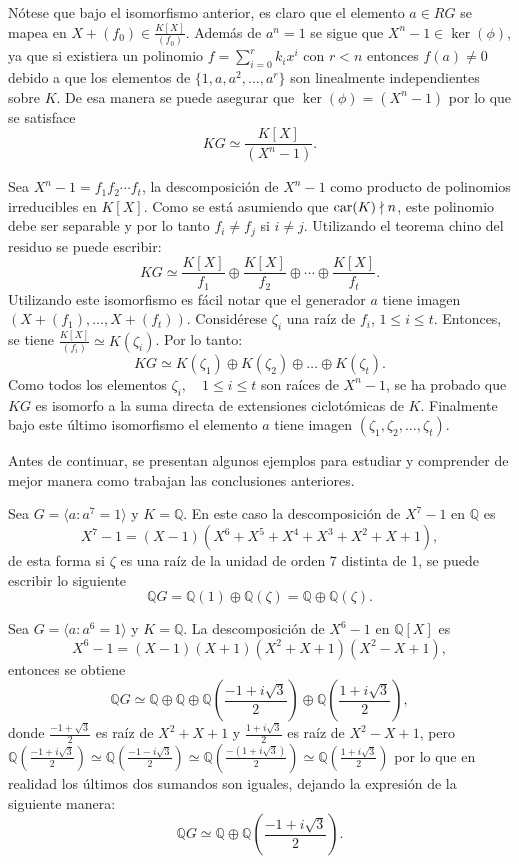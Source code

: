 Nótese que bajo el isomorfismo anterior, es claro que el elemento $a \in RG$ se mapea en $X + (f_0) \in \frac{K[X]}{(f_0)}$. Además de $a^n = 1$ se sigue que $X^n -1 \in \ker(\phi)$, ya que si existiera un polinomio $f = \sum_{i=0}^{r}k_ix^i$ con $r < n$ entonces $f(a) \neq 0$ debido a que los elementos de $\{1,a,a^2, \dots, a^r \}$ son linealmente independientes sobre $K$. De esa manera se puede asegurar que $\ker(\phi) = (X^n -1)$ por lo que se satisface 
\[KG \simeq \frac{K[X]}{(X^n -1 )}. \]

Sea $ X^n -1 = f_1f_2\cdots f_t$, la descomposición de $X^n -1$ como producto de polinomios irreducibles en $K[X]$. Como se está asumiendo que $\operatorname{car}(K) \nmid n$, este polinomio debe ser separable y por lo tanto $f_i \neq f_j$ si $i \neq j$. Utilizando el teorema chino del residuo se puede escribir:
\[KG \simeq \frac{K[X]}{f_1} \oplus \frac{K[X]}{f_2} \oplus \cdots \oplus \frac{K[X]}{f_t}. \]
\indent Utilizando este isomorfismo es fácil notar que el generador $a$ tiene imagen $( X + (f_1)  , \dots, X + (f_t) ) $. 
Considérese $\zeta_i$ una raíz de $f_i$, $1 \leq i \leq t$. Entonces, se tiene $\frac{K[X]}{(f_i)} \simeq K(\zeta_i)$. Por lo tanto:
\[ KG \simeq K(\zeta_1) \oplus K(\zeta_2) \oplus \dots \oplus K(\zeta_t). \]
\indent Como todos los elementos $\zeta_i , \quad 1 \leq i \leq t$ son raíces de $X^n -1$, se ha probado que $KG$ es isomorfo a la suma directa de extensiones ciclotómicas de $K$. Finalmente bajo este 
último isomorfismo el elemento $a$ tiene imagen $(\zeta_1 , \zeta_2, \dots ,\zeta_t)$.

Antes de continuar, se presentan algunos ejemplos para estudiar y comprender de mejor manera como trabajan las conclusiones anteriores.
\begin{ejemplo}\label{ejem:orden7}
Sea $G = \langle a \colon a^7 = 1 \rangle$ y $K = \mathds{Q} $. 
En este caso la descomposición de $ X^7 -1$ en $\mathds{Q}$ es 
\[ X^7 -1 = (X-1)(X^6 + X^5 + X^4 + X^3 + X^2 + X + 1), \]
de esta forma si $\zeta$ es una raíz de la unidad de orden 7 distinta de 1, se puede escribir lo siguiente
\[  \mathds{Q}G = \mathds{Q}(1) \oplus \mathds{Q}(\zeta) = \mathds{Q} \oplus \mathds{Q}(\zeta).   \]
\end{ejemplo}
\begin{ejemplo}
Sea $G = \langle a: a^6 = 1 \rangle$ y $K = \mathds{Q}$. La descomposición de $X^6 - 1 $ en \nopagebreak[0] $\mathds{Q}[X]$ es 
\[ X^6 - 1 = (X-1)(X+1)(X^2 + X + 1)(X^2-X+1), \]
entonces se obtiene 
\[  \mathds{Q}G \simeq \mathds{Q} \oplus \mathds{Q} \oplus \mathds{Q}\left( \frac{-1+i\sqrt{3}}{2} \right) \oplus \mathds{Q}\left( \frac{1+i\sqrt{3}}{2} \right),\]
donde $\frac{-1 + \sqrt{3}}{2}$ es raíz de $X^2+X+1$ y $\frac{1+i\sqrt{3}}{2}$ es raíz de $X^2-X+1$, pero $\mathds{Q}\left( \frac{-1+i\sqrt{3}}{2} \right) \simeq \mathds{Q}\left( \frac{-1-i\sqrt{3}}{2} \right) \simeq \mathds{Q}\left( \frac{-(1+i\sqrt{3})}{2} \right) \simeq \mathds{Q}\left( \frac{1+i\sqrt{3}}{2} \right)$
por lo que en realidad los últimos dos sumandos son iguales, dejando la expresión de la siguiente manera:
\[  \mathds{Q}G \simeq  \mathds{Q} \oplus \mathds{Q}\left( \frac{-1+i\sqrt{3}}{2} \right).   \]
\end{ejemplo}

